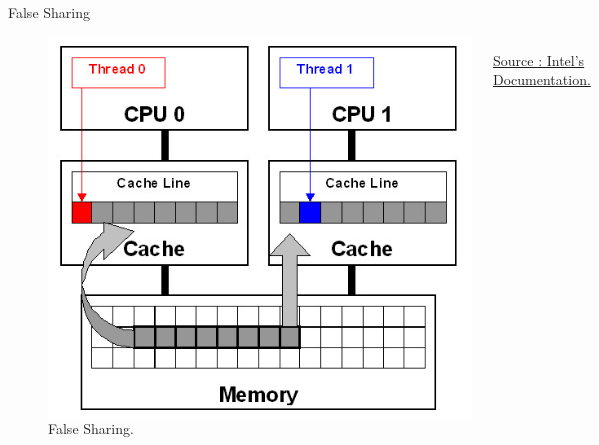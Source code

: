 \documentclass{beamer}
\begin{document}
\begin{frame}{False Sharing}
	\begin{figure}
	\begin{columns}
      \includegraphics[width=\textwidth]{false_sharing.jpg}
      \caption{False Sharing.\label{Fig:false_sharing}}{\href{https://software.intel.com/en-us/articles/avoiding-and-identifying-false-sharing-among-threads}{Source : Intel's Documentation.}}
    \end{columns}	
    \end{figure}
\end{frame}
\end{document}
